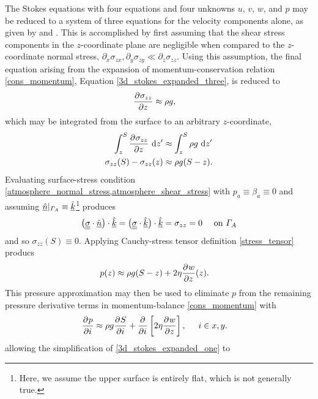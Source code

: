 The Stokes equations with four equations and four unknowns $u$, $v$, $w$, and $p$ may be reduced to a system of three equations for the velocity components alone, as given by \citet{blatter_1995} and \citet{pattyn_2003}.
This is accomplished by first assuming that the shear stress components in the $z$-coordinate plane are negligible when compared to the $z$-coordinate normal stress, \ie $\partial_x \sigma_{zx}, \partial_y \sigma_{zy} \ll \partial_z \sigma_{zz}$.
Using this assumption, the final equation arising from the expansion of momentum-conservation relation \cref{cons_momentum}, Equation \cref{3d_stokes_expanded_three}, is reduced to
\begin{align}
  \label{stress_tensor_simplification}
  \frac{\partial{^{}} \sigma_{zz}}{\partial z{^{}} } &\approx \rho g,
\end{align}
which may be integrated from the surface to an arbitrary $z$-coordinate,
\begin{align*}
  \int_z^S \frac{\partial{^{}} \sigma_{zz}}{\partial z{^{}} } \ \mathrm{d}z' &\approx \int_z^S \rho g \ \mathrm{d}z' \\
  \sigma_{zz}(S) - \sigma_{zz}(z) &\approx \rho g (S - z).
\end{align*}
Evaluating surface-stress condition \cref{atmosphere_normal_stress,atmosphere_shear_stress} with $p_a \equiv \beta_a \equiv 0$ and assuming $\underline{\hat{n}} |_{\varGamma_A} \equiv \underline{\hat{k}}$\footnote{Here, we assume the upper surface is entirely flat, which is not generally true.} produces
\begin{align*}
  \big( \underline{\underline{\sigma}} \cdot \underline{\hat{n}} \big) \cdot \underline{\hat{k}} = \big( \underline{\underline{\sigma}} \cdot \underline{\hat{k}} \big) \cdot \underline{\hat{k}} = \sigma_{zz} = 0  && \text{ on } \varGamma_A 
\end{align*}
and so $\sigma_{zz}(S) \equiv 0$.
Applying Cauchy-stress tensor definition \cref{stress_tensor} producs
\begin{align}
  \label{bp_pressure}
  p(z) &\approx \rho g(S - z) + 2\eta \frac{\partial{^{}} w}{\partial z{^{}} }(z).
\end{align}
This pressure approximation may then be used to eliminate $p$ from the remaining pressure derivative terms in momentum-balance \cref{cons_momentum} with
\begin{align}
  \label{bp_pressure_gradient}
  \frac{\partial{^{}} p}{\partial i{^{}} } &\approx
  \rho g\frac{\partial{^{}} S}{\partial i{^{}} } + \frac{\partial{^{}} }{\partial i{^{}} } \left[ 2\eta \frac{\partial{^{}} w}{\partial z{^{}} } \right], \hspace{5mm} i \in x,y.
\end{align}
allowing the simplification of \cref{3d_stokes_expanded_one} to
